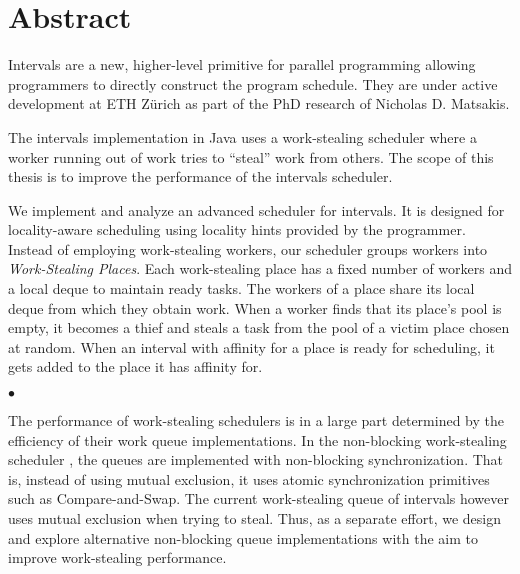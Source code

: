 
\chapter*{Abstract}
\label{chap:abstract}

Intervals are a new, higher-level primitive for parallel programming
allowing programmers to directly construct the program schedule. They
are under active development at ETH Zürich as part of the PhD research
of Nicholas D. Matsakis.

The intervals implementation in Java uses a work-stealing scheduler
where a worker running out of work tries to ``steal'' work from
others. The scope of this thesis is to improve the performance of the
intervals scheduler.

We implement and analyze an advanced scheduler for intervals. It is
designed for locality-aware scheduling using locality hints provided
by the programmer. Instead of employing work-stealing workers, our
scheduler groups workers into \emph{Work-Stealing Places}.  Each
work-stealing place has a fixed number of workers and a local deque to
maintain ready tasks. The workers of a place share its local deque
from which they obtain work. When a worker finds that its place's pool
is empty, it becomes a thief and steals a task from the pool of a
victim place chosen at random. When an interval with affinity for a
place is ready for scheduling, it gets added to the place it has
affinity for.

\begin{center}
  $\bullet$
\end{center}

The performance of work-stealing schedulers is in a large part
determined by the efficiency of their work queue implementations. In
the non-blocking work-stealing scheduler \cite{Arora1998}, the queues
are implemented with non-blocking synchronization. That is, instead of
using mutual exclusion, it uses atomic synchronization primitives such
as Compare-and-Swap. The current work-stealing queue of intervals
however uses mutual exclusion when trying to steal. Thus, as a
separate effort, we design and explore alternative non-blocking queue
implementations with the aim to improve work-stealing performance.


